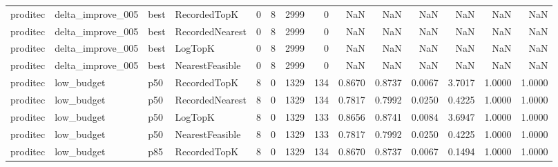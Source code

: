 \begin{tabular}{llllrrrrrrrrrr}
proditec &    delta\_improve\_005 &   best &    RecordedTopK &           0 &          8 &           2999 &                   0 &            NaN &             NaN &                       NaN &            NaN &                    NaN &                     NaN \\
proditec &    delta\_improve\_005 &   best & RecordedNearest &           0 &          8 &           2999 &                   0 &            NaN &             NaN &                       NaN &            NaN &                    NaN &                     NaN \\
proditec &    delta\_improve\_005 &   best &         LogTopK &           0 &          8 &           2999 &                   0 &            NaN &             NaN &                       NaN &            NaN &                    NaN &                     NaN \\
proditec &    delta\_improve\_005 &   best & NearestFeasible &           0 &          8 &           2999 &                   0 &            NaN &             NaN &                       NaN &            NaN &                    NaN &                     NaN \\
proditec &           low\_budget &    p50 &    RecordedTopK &           8 &          0 &           1329 &                 134 &         0.8670 &          0.8737 &                    0.0067 &         3.7017 &                 1.0000 &                  1.0000 \\
proditec &           low\_budget &    p50 & RecordedNearest &           8 &          0 &           1329 &                 134 &         0.7817 &          0.7992 &                    0.0250 &         0.4225 &                 1.0000 &                  1.0000 \\
proditec &           low\_budget &    p50 &         LogTopK &           8 &          0 &           1329 &                 133 &         0.8656 &          0.8741 &                    0.0084 &         3.6947 &                 1.0000 &                  1.0000 \\
proditec &           low\_budget &    p50 & NearestFeasible &           8 &          0 &           1329 &                 133 &         0.7817 &          0.7992 &                    0.0250 &         0.4225 &                 1.0000 &                  1.0000 \\
proditec &           low\_budget &    p85 &    RecordedTopK &           8 &          0 &           1329 &                 134 &         0.8670 &          0.8737 &                    0.0067 &         0.1494 &                 1.0000 &                  1.0000 \\

\end{tabular}

